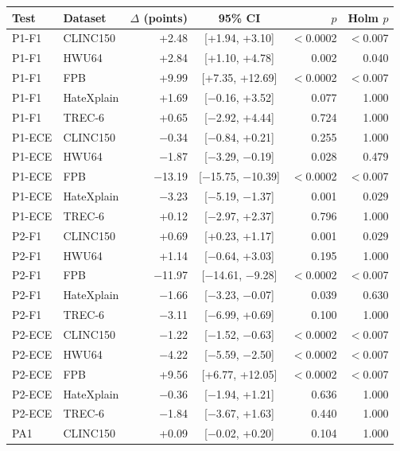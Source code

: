 \begin{tabular}{llrcrr}
\toprule
Test & Dataset & $\Delta$ (points) & 95\% CI & $p$ & Holm $p$ \\
\midrule
\rowcolor{rowhl} P1-F1 & CLINC150 & +2.48 & [+1.94, +3.10] & $<$0.0002 & $<$0.007 \\
\rowcolor{rowhl} P1-F1 & HWU64 & +2.84 & [+1.10, +4.78] & 0.002 & 0.040 \\
\rowcolor{rowhl} P1-F1 & FPB & +9.99 & [+7.35, +12.69] & $<$0.0002 & $<$0.007 \\
P1-F1 & HateXplain & +1.69 & [$-$0.16, +3.52] & 0.077 & 1.000 \\
P1-F1 & TREC-6 & +0.65 & [$-$2.92, +4.44] & 0.724 & 1.000 \\
\midrule
P1-ECE & CLINC150 & $-$0.34 & [$-$0.84, +0.21] & 0.255 & 1.000 \\
P1-ECE & HWU64 & $-$1.87 & [$-$3.29, $-$0.19] & 0.028 & 0.479 \\
\rowcolor{rowhl} P1-ECE & FPB & $-$13.19 & [$-$15.75, $-$10.39] & $<$0.0002 & $<$0.007 \\
\rowcolor{rowhl} P1-ECE & HateXplain & $-$3.23 & [$-$5.19, $-$1.37] & 0.001 & 0.029 \\
P1-ECE & TREC-6 & +0.12 & [$-$2.97, +2.37] & 0.796 & 1.000 \\
\midrule
\rowcolor{rowhl} P2-F1 & CLINC150 & +0.69 & [+0.23, +1.17] & 0.001 & 0.029 \\
P2-F1 & HWU64 & +1.14 & [$-$0.64, +3.03] & 0.195 & 1.000 \\
\rowcolor{rowhl} P2-F1 & FPB & $-$11.97 & [$-$14.61, $-$9.28] & $<$0.0002 & $<$0.007 \\
P2-F1 & HateXplain & $-$1.66 & [$-$3.23, $-$0.07] & 0.039 & 0.630 \\
P2-F1 & TREC-6 & $-$3.11 & [$-$6.99, +0.69] & 0.100 & 1.000 \\
\midrule
\rowcolor{rowhl} P2-ECE & CLINC150 & $-$1.22 & [$-$1.52, $-$0.63] & $<$0.0002 & $<$0.007 \\
\rowcolor{rowhl} P2-ECE & HWU64 & $-$4.22 & [$-$5.59, $-$2.50] & $<$0.0002 & $<$0.007 \\
\rowcolor{rowhl} P2-ECE & FPB & +9.56 & [+6.77, +12.05] & $<$0.0002 & $<$0.007 \\
P2-ECE & HateXplain & $-$0.36 & [$-$1.94, +1.21] & 0.636 & 1.000 \\
P2-ECE & TREC-6 & $-$1.84 & [$-$3.67, +1.63] & 0.440 & 1.000 \\
\midrule
PA1 & CLINC150 & +0.09 & [$-$0.02, +0.20] & 0.104 & 1.000 \\

\end{tabular}
